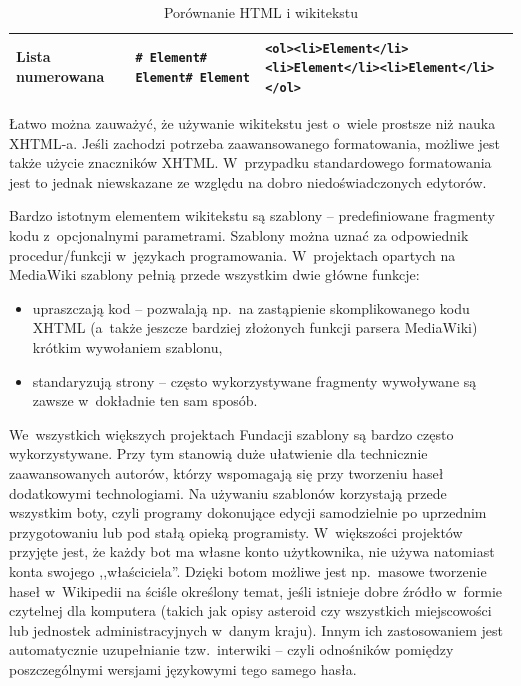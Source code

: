 \documentclass{pracamgr}
\begin{document}
\begin{table}[h]
\begin{center}
{\begin{tabularx}{\textwidth}{ |l|X|X| }
		\hline Lista numerowana & \texttt{\# Element\newline \# Element\newline \# Element}
		 & \texttt{<ol>\newline <li>Element</li>\newline <li>Element</li>\newline <li>Element</li>\newline </ol>}\\
		\hline
	\end{tabularx}
}
\caption{Porównanie HTML i wikitekstu}
\label{tab:html-wiki}
\end{center}
\end{table}

Łatwo można zauważyć, że używanie wikitekstu jest o~wiele prostsze niż nauka XHTML-a. Jeśli zachodzi potrzeba zaawansowanego formatowania, możliwe jest także użycie znaczników XHTML. W~przypadku standardowego formatowania jest to jednak niewskazane ze względu na dobro niedoświadczonych edytorów.

Bardzo istotnym elementem wikitekstu są szablony -- predefiniowane fragmenty kodu z~opcjonalnymi parametrami. Szablony można uznać za odpowiednik procedur/funkcji w~językach programowania. W~projektach opartych na MediaWiki szablony pełnią przede wszystkim dwie główne funkcje:
\begin{itemize}
	\item upraszczają kod -- pozwalają np.\ na zastąpienie skomplikowanego kodu XHTML (a~także jeszcze bardziej złożonych funkcji parsera MediaWiki) krótkim wywołaniem szablonu,
	\item standaryzują strony -- często wykorzystywane fragmenty wywoływane są zawsze w~dokładnie ten sam sposób.
\end{itemize}
We~wszystkich większych projektach Fundacji szablony są bardzo często wykorzystywane. Przy tym stanowią duże ułatwienie dla technicznie zaawansowanych autorów, którzy wspomagają się przy tworzeniu haseł dodatkowymi technologiami. Na używaniu szablonów korzystają przede wszystkim boty, czyli programy dokonujące edycji samodzielnie po uprzednim przygotowaniu lub pod stałą opieką programisty. W~większości projektów przyjęte jest, że każdy bot ma własne konto użytkownika, nie używa natomiast konta swojego ,,właściciela''. Dzięki botom możliwe jest np.\ masowe tworzenie haseł w~Wikipedii na ściśle określony temat, jeśli istnieje dobre źródło w~formie czytelnej dla komputera (takich jak opisy asteroid czy wszystkich miejscowości lub jednostek administracyjnych w~danym kraju). Innym ich zastosowaniem jest automatycznie uzupełnianie tzw.\ interwiki -- czyli odnośników pomiędzy poszczególnymi wersjami językowymi tego samego hasła.
\end{document}

